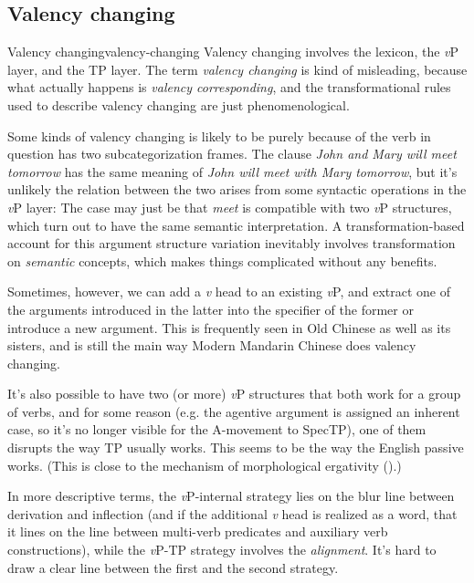 \documentclass[UTF8, a4paper, oneside, scheme=plain]{ctexrep}
\newcommand*{\term}[1]{\emph{#1}}
\newcommand{\corpus}[1]{\emph{#1}}
\newcommand{\vP}{\textit{v}P}
\begin{document}
\subsection{Valency changing}\label{sec:overview.valency-changing}

\begin{theorybox}{Valency changing}{valency-changing}
    Valency changing involves the lexicon, the \vP{} layer, and the TP layer.
    The term \term{valency changing} is kind of misleading,
    because what actually happens is \emph{valency corresponding},
    and the transformational rules used to describe valency changing 
    are just phenomenological.

    Some kinds of valency changing is likely to be purely because of 
    the verb in question has two subcategorization frames.
    The clause \corpus{John and Mary will meet tomorrow} 
    has the same meaning of \corpus{John will meet with Mary tomorrow},
    but it's unlikely the relation between the two arises from some syntactic operations in the \vP{} layer:
    The case may just be that \corpus{meet} is compatible with two \vP{} structures,
    which turn out to have the same semantic interpretation.
    A transformation-based account for this argument structure variation 
    inevitably involves transformation on \emph{semantic} concepts,
    which makes things complicated without any benefits.

    Sometimes, however, we can add a \term{v} head to an existing \vP{},
    and extract one of the arguments introduced in the latter into the specifier of the former
    or introduce a new argument.
    This is frequently seen in Old Chinese as well as its sisters,
    and is still the main way Modern Mandarin Chinese does valency changing.

    It's also possible to have two (or more) \vP{} structures that both work for a group of verbs,
    and for some reason (e.g. the agentive argument is assigned an inherent case, 
    so it's no longer visible for the A-movement to SpecTP),
    one of them disrupts the way TP usually works.
    This seems to be the way the English passive works.
    (This is close to the mechanism of morphological ergativity ().)

    In more descriptive terms,
    the \vP-internal strategy lies on the blur line between derivation and inflection
    (and if the additional \term{v} head is realized as a word, 
    that it lines on the line between multi-verb predicates and auxiliary verb constructions),
    while the \vP-TP strategy involves the \emph{alignment}.
    It's hard to draw a clear line between the first and the second strategy.
\end{theorybox}
\end{document}
